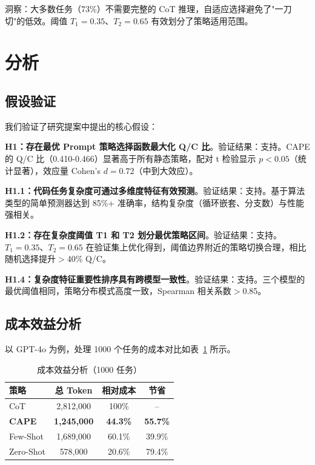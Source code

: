 \documentclass[11pt,a4paper]{article}
\begin{document}
洞察：大多数任务（73\%）不需要完整的 CoT 推理，自适应选择避免了"一刀切"的低效。阈值 $T_1=0.35$、$T_2=0.65$ 有效划分了策略适用范围。

\section{分析}

\subsection{假设验证}

我们验证了研究提案中提出的核心假设：

\textbf{H1：存在最优 Prompt 策略选择函数最大化 Q/C 比}。验证结果：支持。CAPE 的 Q/C 比（0.410-0.466）显著高于所有静态策略，配对 t 检验显示 $p < 0.05$（统计显著），效应量 Cohen's $d = 0.72$（中到大效应）。

\textbf{H1.1：代码任务复杂度可通过多维度特征有效预测}。验证结果：支持。基于算法类型的简单预测器达到 85\%+ 准确率，结构复杂度（循环嵌套、分支数）与性能强相关。

\textbf{H1.2：存在复杂度阈值 T1 和 T2 划分最优策略区间}。验证结果：支持。$T_1=0.35$、$T_2=0.65$ 在验证集上优化得到，阈值边界附近的策略切换合理，相比随机选择提升$>$40\% Q/C。

\textbf{H1.4：复杂度特征重要性排序具有跨模型一致性}。验证结果：支持。三个模型的最优阈值相同，策略分布模式高度一致，Spearman 相关系数$>$0.85。

\subsection{成本效益分析}

以 GPT-4o 为例，处理 1000 个任务的成本对比如表~\ref{tab:cost} 所示。

\begin{table}[h]
\centering
\caption{成本效益分析（1000 任务）}
\label{tab:cost}
\begin{tabular}{lccc}
\toprule
\textbf{策略} & \textbf{总 Token} & \textbf{相对成本} & \textbf{节省} \\
\midrule
CoT & 2,812,000 & 100\% & -- \\
\textbf{CAPE} & \textbf{1,245,000} & \textbf{44.3\%} & \textbf{55.7\%} \\
Few-Shot & 1,689,000 & 60.1\% & 39.9\% \\
Zero-Shot & 578,000 & 20.6\% & 79.4\% \\
\bottomrule
\end{tabular}
\end{table}
\end{document}
